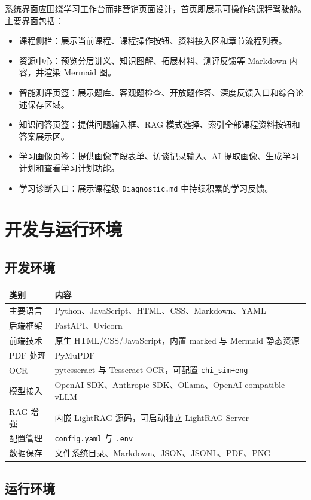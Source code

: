 \documentclass[UTF8,fontset=windows,zihao=-4,openany]{ctexrep}
\begin{document}
系统界面应围绕学习工作台而非营销页面设计，首页即展示可操作的课程驾驶舱。主要界面包括：
\begin{itemize}
  \item 课程侧栏：展示当前课程、课程操作按钮、资料接入区和章节流程列表。
  \item 资源中心：预览分层讲义、知识图解、拓展材料、测评反馈等 Markdown 内容，并渲染 Mermaid 图。
  \item 智能测评页签：展示题库、客观题检查、开放题作答、深度反馈入口和综合论述保存区域。
  \item 知识问答页签：提供问题输入框、RAG 模式选择、索引全部课程资料按钮和答案展示区。
  \item 学习画像页签：提供画像字段表单、访谈记录输入、AI 提取画像、生成学习计划和查看学习计划功能。
  \item 学习诊断入口：展示课程级 \texttt{Diagnostic.md} 中持续积累的学习反馈。
\end{itemize}

\section{开发与运行环境}

\subsection{开发环境}

\begin{longtable}{p{}p{}}
\toprule
类别 & 内容\\
\midrule
主要语言 & Python、JavaScript、HTML、CSS、Markdown、YAML\\
后端框架 & FastAPI、Uvicorn\\
前端技术 & 原生 HTML/CSS/JavaScript，内置 marked 与 Mermaid 静态资源\\
PDF 处理 & PyMuPDF\\
OCR & pytesseract 与 Tesseract OCR，可配置 \texttt{chi\_sim+eng}\\
模型接入 & OpenAI SDK、Anthropic SDK、Ollama、OpenAI-compatible vLLM\\
RAG 增强 & 内嵌 LightRAG 源码，可启动独立 LightRAG Server\\
配置管理 & \texttt{config.yaml} 与 \texttt{.env}\\
数据保存 & 文件系统目录、Markdown、JSON、JSONL、PDF、PNG\\
\bottomrule
\end{longtable}

\subsection{运行环境}
\end{document}
